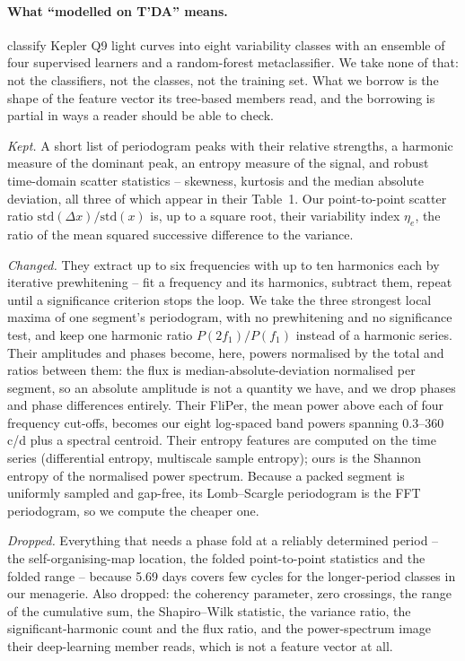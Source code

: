 \documentclass{article}
\begin{document}
\paragraph{What ``modelled on T'DA'' means.} \citet{audenaert2021} classify Kepler Q9 light curves
into eight variability classes with an ensemble of four supervised learners and a random-forest
metaclassifier. We take none of that: not the classifiers, not the classes, not the training set.
What we borrow is the shape of the feature vector its tree-based members read, and the borrowing is
partial in ways a reader should be able to check.

\emph{Kept.} A short list of periodogram peaks with their relative strengths, a harmonic
measure of the dominant peak, an entropy measure of the signal, and robust time-domain scatter
statistics -- skewness, kurtosis and the median absolute deviation, all three of which appear in
their Table~1. Our point-to-point scatter ratio $\mathrm{std}(\Delta x)/\mathrm{std}(x)$ is, up to a
square root, their variability index $\eta_{e}$, the ratio of the mean squared successive difference
to the variance.

\emph{Changed.} They extract up to six frequencies with up to ten harmonics each by iterative
prewhitening -- fit a frequency and its harmonics, subtract them, repeat until a significance
criterion stops the loop. We take the three strongest local maxima of one segment's periodogram, with
no prewhitening and no significance test, and keep one harmonic ratio $P(2f_{1})/P(f_{1})$ instead of
a harmonic series. Their amplitudes and phases become, here, powers normalised by the total and
ratios between them: the flux is median-absolute-deviation normalised per segment, so an absolute
amplitude is not a quantity we have, and we drop phases and phase differences entirely. Their
FliPer, the mean power above each of four frequency cut-offs, becomes our eight log-spaced band
powers spanning 0.3--360\,c/d plus a spectral centroid. Their entropy features are computed on the
time series (differential entropy, multiscale sample entropy); ours is the Shannon entropy of the
normalised power spectrum. Because a packed segment is uniformly sampled and gap-free, its
Lomb--Scargle periodogram is the FFT periodogram, so we compute the cheaper one.

\emph{Dropped.} Everything that needs a phase fold at a reliably determined period -- the
self-organising-map location, the folded point-to-point statistics and the folded range -- because
5.69 days covers few cycles for the longer-period classes in our menagerie. Also dropped: the
coherency parameter, zero crossings, the range of the cumulative sum, the Shapiro--Wilk statistic,
the variance ratio, the significant-harmonic count and the flux ratio, and the power-spectrum image
their deep-learning member reads, which is not a feature vector at all.
\end{document}
